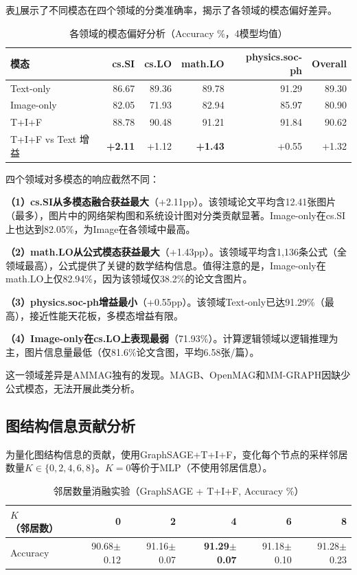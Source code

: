 表\ref{tab:domain_modality}展示了不同模态在四个领域的分类准确率，揭示了各领域的模态偏好差异。

\begin{table}[htbp]
  \centering
  \caption{各领域的模态偏好分析（Accuracy \%，4模型均值）}
  \label{tab:domain_modality}
  \begin{tabular}{lrrrrr}
    \toprule
    模态 & cs.SI & cs.LO & math.LO & physics.soc-ph & Overall \\
    \midrule
    Text-only & 86.67 & 89.36 & 89.78 & 91.29 & 89.30 \\
    Image-only & 82.05 & 71.93 & 82.94 & 85.97 & 80.90 \\
    T+I+F & 88.78 & 90.48 & 91.21 & 91.84 & 90.62 \\
    \midrule
    T+I+F vs Text 增益 & \textbf{+2.11} & +1.12 & \textbf{+1.43} & +0.55 & +1.32 \\
    \bottomrule
  \end{tabular}
\end{table}

四个领域对多模态的响应截然不同：

\textbf{（1）cs.SI从多模态融合获益最大}（+2.11pp）。该领域论文平均含12.41张图片（最多），图片中的网络架构图和系统设计图对分类贡献显著。Image-only在cs.SI上也达到82.05\%，为Image在各领域中最高。

\textbf{（2）math.LO从公式模态获益最大}（+1.43pp）。该领域平均含1,136条公式（全领域最高），公式提供了关键的数学结构信息。值得注意的是，Image-only在math.LO上仅82.94\%，因为该领域仅38.2\%的论文含图片。

\textbf{（3）physics.soc-ph增益最小}（+0.55pp）。该领域Text-only已达91.29\%（最高），接近性能天花板，多模态增益有限。

\textbf{（4）Image-only在cs.LO上表现最弱}（71.93\%）。计算逻辑领域以逻辑推理为主，图片信息量最低（仅81.6\%论文含图，平均6.58张/篇）。

这一领域差异是AMMAG独有的发现。MAGB\cite{yan2025magb}、OpenMAG\cite{wan2026openmag}和MM-GRAPH\cite{zhu2025mmgraph}因缺少公式模态，无法开展此类分析。

\subsection{图结构信息贡献分析}

为量化图结构信息的贡献，使用GraphSAGE+T+I+F，变化每个节点的采样邻居数量$K \in \{0, 2, 4, 6, 8\}$。$K=0$等价于MLP（不使用邻居信息）。

\begin{table}[htbp]
  \centering
  \caption{邻居数量消融实验（GraphSAGE + T+I+F, Accuracy \%）}
  \label{tab:neighbor}
  \begin{tabular}{lrrrrr}
    \toprule
    $K$（邻居数） & 0 & 2 & 4 & 6 & 8 \\
    \midrule
    Accuracy & 90.68$\pm$0.12 & 91.16$\pm$0.07 & \textbf{91.29$\pm$0.07} & 91.18$\pm$0.10 & 91.28$\pm$0.23 \\
    \bottomrule
  \end{tabular}
\end{table}

